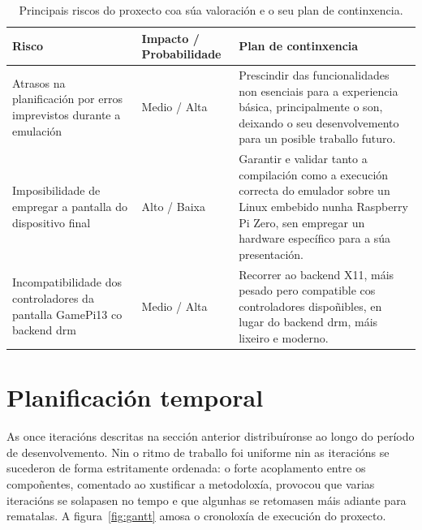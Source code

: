 \begin{table}[htbp]
  \centering
  \setlength{\tabcolsep}{8pt}
  \begin{tabular}{>{\raggedright\arraybackslash}p{3.2cm}|>{\raggedright\arraybackslash}p{2.3cm}|>{\raggedright\arraybackslash}p{7cm}}
    \rowcolor{udcpink!25}
    \textbf{Risco} & \textbf{Impacto / Probabilidade} & \textbf{Plan de continxencia} \\\hline

    Atrasos na planificación por erros imprevistos durante a emulación
      & Medio / Alta
      & Prescindir das funcionalidades non esenciais para a experiencia básica, principalmente o son,
      deixando o seu desenvolvemento para un posible traballo futuro. \\

    Imposibilidade de empregar a pantalla do dispositivo final
      & Alto / Baixa
      & Garantir e validar tanto a compilación como a execución correcta do emulador sobre un Linux embebido nunha Raspberry Pi Zero,
      sen empregar un hardware específico para a súa presentación. \\

    Incompatibilidade dos controladores da pantalla GamePi13 co backend \acrfull{drm}
      & Medio / Alta
      & Recorrer ao backend X11, máis pesado pero compatible cos controladores dispoñibles,
      en lugar do backend \acrshort{drm}, máis lixeiro e moderno. \\

  \end{tabular}
  \caption{Principais riscos do proxecto coa súa valoración e o seu plan de continxencia.}
  \label{tab:riscos}
\end{table}


\section{Planificación temporal}
As once iteracións descritas na sección anterior distribuíronse ao longo do período de
desenvolvemento. Nin o ritmo de traballo foi uniforme nin as iteracións se
sucederon de forma estritamente ordenada: o forte acoplamento entre os compoñentes,
comentado ao xustificar a metodoloxía, provocou que varias iteracións se solapasen no
tempo e que algunhas se retomasen máis adiante para rematalas.
A figura~\ref{fig:gantt} amosa o cronoloxía de execución do proxecto.

